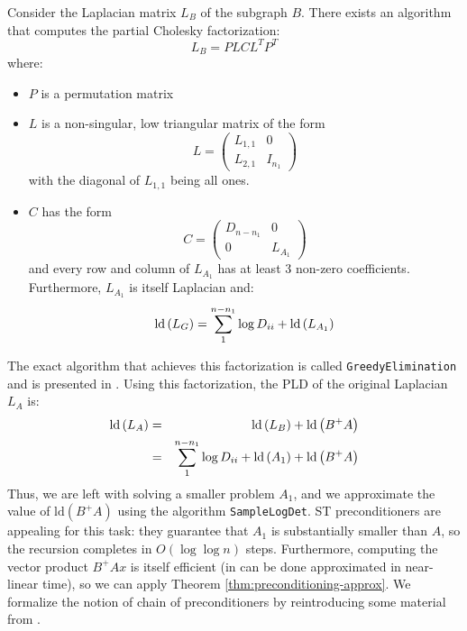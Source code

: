 Consider the Laplacian matrix $L_{B}$ of the subgraph $B$. There
exists an algorithm that computes the partial Cholesky factorization:
\[
L_{B}=PLCL^{T}P^{T}
\]
where: 
\begin{itemize}
\item $P$ is a permutation matrix 
\item $L$ is a non-singular, low triangular matrix of the form 
\[
L=\left(\begin{array}{cc}
L_{1,1} & 0\\
L_{2,1} & I_{n_{1}}
\end{array}\right)
\]
with the diagonal of $L_{1,1}$ being all ones. 
\item $C$ has the form 
\[
C=\left(\begin{array}{cc}
D_{n-n_{1}} & 0\\
0 & L_{A_{1}}
\end{array}\right)
\]
and every row and column of $L_{A_{1}}$ has at least 3 non-zero coefficients.
Furthermore, $L_{A_{1}}$ is itself Laplacian and: 
\[
\text{ld}\left(L_{G}\right)=\sum_{1}^{n-n_{1}}\log D_{ii}+\mbox{\text{ld}}\left(L_{A_{1}}\right)
\]

\end{itemize}
The exact algorithm that achieves this factorization is called \texttt{GreedyElimination}
and is presented in \cite{Koutis2010}. Using this factorization,
the PLD of the original Laplacian $L_{A}$ is: 
\begin{eqnarray}
\text{ld}\left(L_{A}\right) & = & \text{ld}\left(L_{B}\right)+\text{ld}\left(B^{+}A\right)\nonumber \\
 & = & \sum_{1}^{n-n_{1}}\log D_{ii}+\mbox{\text{ld}}\left(A_{1}\right)+\text{ld}\left(B^{+}A\right)\label{eq:chain-recursion}
\end{eqnarray}
Thus, we are left with solving a smaller problem $A_{1}$, and we
approximate the value of $\text{ld}\left(B^{+}A\right)$ using the
algorithm \texttt{SampleLogDet}. ST preconditioners are appealing
for this task: they guarantee that $A_{1}$ is substantially smaller
than $A$, so the recursion completes in $O\left(\log\log n\right)$
steps. Furthermore, computing the vector product $B^{+}Ax$ is itself
efficient (in can be done approximated in near-linear time), so we
can apply Theorem \ref{thm:preconditioning-approx}. We formalize
the notion of chain of preconditioners by reintroducing some material
from \cite{Koutis2010}.

